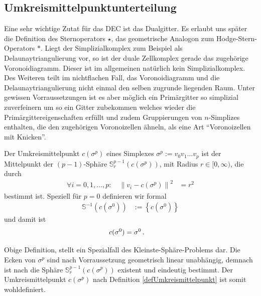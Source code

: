   \subsection{Umkreismittelpunktunterteilung}
    Eine sehr wichtige Zutat für das DEC ist das Dualgitter. 
    Es erlaubt uns später die Definition des Sternoperators \( \star \), das geometrische Analogon zum Hodge-Stern-Operators \( * \).
    Liegt der Simplizialkomplex zum Beispiel als Delaunaytriangulierung vor, so ist der duale Zellkomplex gerade das zugehörige Voronoidiagramm. 
    Dieser ist im allgemeinen natürlich kein Simplizialkomplex. Des Weiteren teilt im nichtflachen Fall, das Voronoidiagramm und die Delaunaytriangulierung nicht einmal den selben zugrunde
    liegenden Raum.
    Unter gewissen Vorraussetzungen ist es aber möglich ein Primärgitter so simplizial zuverfeinern um so ein Gitter zubekommen welches wieder die Primärgittereigenschaften erfüllt und
    zudem Gruppierungen von \( n \)-Simplizes enthalten, die den zugehörigen Voronoizellen ähneln, als eine Art "`Voronoizellen mit Knicken"'.

    \begin{definition}
      \label{defUmkreismittelpunkt}
      Der Umkreismittelpunkt \( c(\sigma^{p}) \) eines Simplexes \( \sigma^{p} := v_{0}v_{1} \ldots v_{p} \) ist der Mittelpunkt der \( (p-1) \)-Sphäre \( \mathds{S}_{r}^{p-1}(c(\sigma^{p})) \),
      mit Radius \( r\in [0,\infty) \), die durch
      \begin{align}
        \label{formSphere}
        \forall i = 0,1, \ldots, p:\quad \left\| v_{i} - c(\sigma^{p}) \right\|^{2} &= r^{2} 
      \end{align}
      bestimmt ist. Speziell für \( p = 0 \) definieren wir formal
      \begin{align}
        \mathds{S}^{-1}(c(\sigma^{0})) &:= \left\{ c(\sigma^{0}) \right\}
      \end{align}
      und damit ist
      \begin{align}
        c(\sigma^{0}) &= \sigma^{0} \,\text{.}
      \end{align}
    \end{definition}

    \begin{bemerkung}
      Obige Definition, stellt ein Spezialfall des Kleinste-Sphäre-Problems dar.
      Die Ecken von \( \sigma^{p} \) sind nach Vorraussetzung geometrisch linear unabhängig, demnach ist nach \cite{converingSphere}  die Sphäre \( \mathds{S}_{r}^{p-1}(c(\sigma^{p})) \) existent
      und eindeutig bestimmt. Der Umkreismittelpunkt \( c(\sigma^{p}) \) nach Definition \ref{defUmkreismittelpunkt} ist somit wohldefiniert.
    \end{bemerkung}

